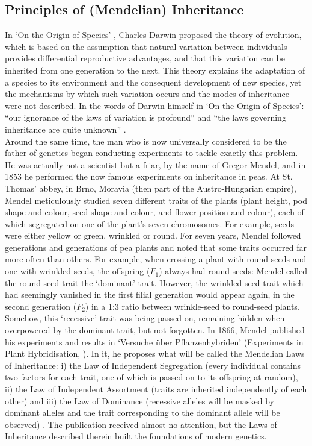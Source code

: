 \subsection{Principles of (Mendelian) Inheritance} %
\label{sec:Mendel}

In `On the Origin of Species' \cite{darwin1859origin}, Charles Darwin proposed the theory of evolution, which is based on the assumption that natural variation between individuals provides differential reproductive advantages, and that this variation can be inherited from one generation to the next. 
This theory explains the adaptation of a species to its environment and the consequent development of new species, yet the mechanisms by which such variation occurs and the modes of inheritance were not described. 
In the words of Darwin himself in `On the Origin of Species': “our ignorance of the laws of variation is profound” and “the laws governing inheritance are quite unknown” \cite{darwin1859origin}.\\

Around the same time, the man who is now universally considered to be the father of genetics began conducting experiments to tackle exactly this problem. 
He was actually not a scientist but a friar, by the name of Gregor Mendel, and in 1853 he performed the now famous experiments on inheritance in peas. 
At St. Thomas' abbey, in Brno, Moravia (then part of the Austro-Hungarian empire), Mendel meticulously studied seven different traits of the plants (plant height, pod shape and colour, seed shape and colour, and flower position and colour), each of which segregated on one of the plant's seven chromosomes. 
For example, seeds were either yellow or green, wrinkled or round. For seven years, Mendel followed generations and generations of pea plants and noted that some traits occurred far more often than others. 
For example, when crossing a plant with round seeds and one with wrinkled seeds, the offspring ($F_1$) always had round seeds: Mendel called the round seed trait the `dominant' trait. 
However, the wrinkled seed trait which had seemingly vanished in the first filial generation would appear again, in the second generation ($F_2$) in a 1:3 ratio between wrinkle-seed to round-seed plants. 
Somehow, this `recessive' trait was being passed on, remaining hidden when overpowered by the dominant trait, but not forgotten. 
In 1866, Mendel published his experiments and results in `Versuche über Pflanzenhybriden' (Experiments in Plant Hybridisation, \cite{mendel1996experiments}). 
In it, he proposes what will be called the Mendelian Laws of Inheritance: i) the Law of Independent Segregation (every individual contains two factors for each trait, one of which is passed on to its offspring at random), ii) the Law of Independent Assortment (traits are inherited independently of each other) and iii) the Law of Dominance (recessive alleles will be masked by dominant alleles and the trait corresponding to the dominant allele will be observed) \cite{mendel1996experiments}. 
The publication received almost no attention, but the Laws of Inheritance described therein built the foundations of modern genetics.\\

